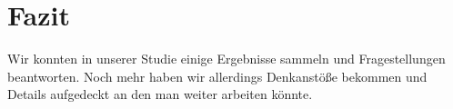 \documentclass{acm_proc_article-sp}
\begin{document}
\section{Fazit}
Wir konnten in unserer Studie einige Ergebnisse sammeln und Fragestellungen beantworten. Noch mehr haben wir allerdings Denkanstöße bekommen und Details aufgedeckt an den man weiter arbeiten könnte.\\
\printbibliography
\end{document}
